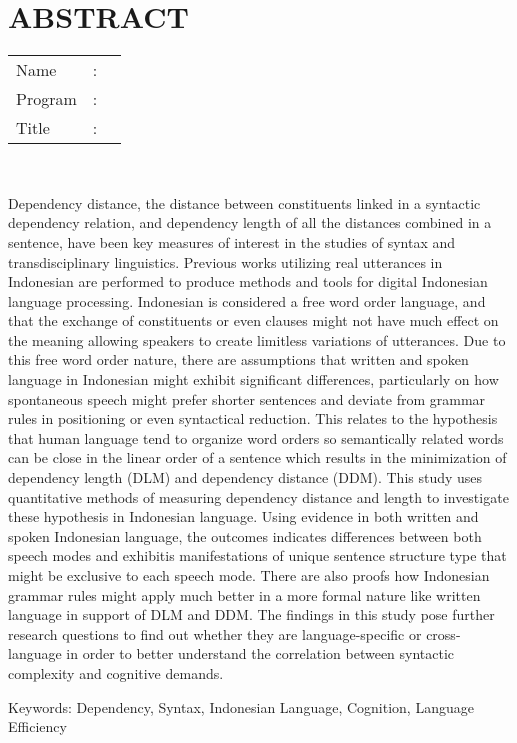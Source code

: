 %
%
%

\chapter*{ABSTRACT}

\vspace*{0.2cm}

\noindent \begin{tabular}{l l p{11.0cm}}
	Name&: & \penulis \\
	Program&: & \programinggris \\
	Title&: & \judulInggris \\
\end{tabular} \\ 

\vspace*{1cm}

Dependency distance, the distance between constituents linked in a syntactic dependency relation, and dependency length of all the distances combined in a sentence, have been key measures of interest in the studies of syntax and transdisciplinary linguistics. Previous works utilizing real utterances in Indonesian are performed to produce methods and tools for digital Indonesian language processing. Indonesian is considered a free word order language, and that the exchange of constituents or even clauses might not have much effect on the meaning allowing speakers to create limitless variations of utterances. Due to this free word order nature, there are assumptions that written and spoken language in Indonesian might exhibit significant differences, particularly on how spontaneous speech might prefer shorter sentences and deviate from grammar rules in positioning or even syntactical reduction. This relates to the hypothesis that human language tend to organize word orders so semantically related words can be close in the linear order of a sentence which results in the minimization of dependency length (DLM) and dependency distance (DDM). This study uses quantitative methods of measuring dependency distance and length to investigate these hypothesis in Indonesian language. Using evidence in both written and spoken Indonesian language, the outcomes indicates differences between both speech modes and exhibitis manifestations of unique sentence structure type that might be exclusive to each speech mode. There are also proofs how Indonesian grammar rules might apply much better in a more formal nature like written language in support of DLM and DDM. The findings in this study pose further research questions to find out whether they are language-specific or cross-language in order to better understand the correlation between syntactic complexity and cognitive demands.

\vspace*{0.5cm}

\noindent Keywords: 
\newline
\noindent Dependency, Syntax, Indonesian Language, Cognition, Language Efficiency

\newpage